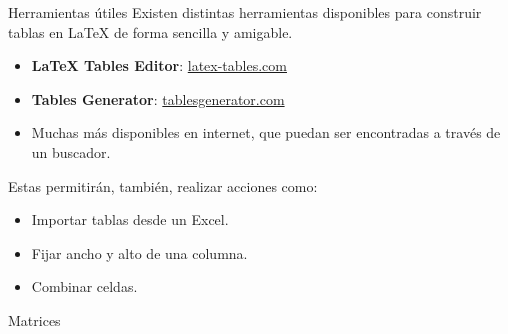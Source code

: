 \documentclass[../slides.tex]{subfiles}
\begin{document}
    \begin{frame}{Herramientas útiles}
        Existen distintas herramientas disponibles para construir tablas en \LaTeX{} de forma sencilla y amigable.

            \begin{itemize}
                \item \textbf{LaTeX Tables Editor}: \href{https://www.latex-tables.com/}{latex-tables.com}
                \item \textbf{Tables Generator}: \href{https://www.tablesgenerator.com/latex_tables}{tablesgenerator.com}
                \item Muchas más disponibles en internet, que puedan ser encontradas a través de un buscador.
            \end{itemize}

        Estas permitirán, también, realizar acciones como:
            \begin{itemize}
                \item Importar tablas desde un Excel.
                \item Fijar ancho y alto de una columna.
                \item Combinar celdas.
            \end{itemize}
    \end{frame}
    
%
%
%
%        

    \begin{frame}{Matrices}

    \end{frame}
\end{document}

